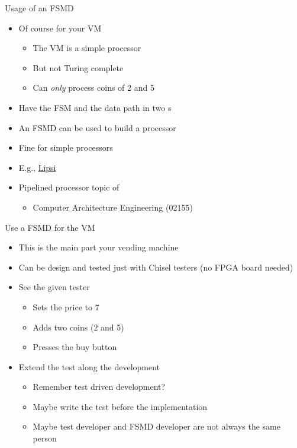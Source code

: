 \begin{frame}[fragile]{Usage of an FSMD}
\begin{itemize}
\item Of course for your VM
\begin{itemize}
\item The VM is a simple processor
\item But not Turing complete
\item Can \emph{only} process coins of 2 and 5
\end{itemize}
\item Have the FSM and the data path in two s
\item An FSMD can be used to build a processor
\item Fine for simple processors
\item E.g., \href{https://github.com/schoeberl/lipsi}{Lipsi}
\item Pipelined processor topic of
\begin{itemize}
\item Computer Architecture Engineering (02155)
\end{itemize}\end{itemize}
\end{frame}

\begin{frame}[fragile]{Use a FSMD for the VM}
\begin{itemize}
\item This is the main part your vending machine
\item Can be design and tested just with Chisel testers (no FPGA board needed)
\item See the given tester
\begin{itemize}
\item Sets the price to 7
\item Adds two coins (2 and 5)
\item Presses the buy button
\end{itemize}
\item Extend the test along the development
\begin{itemize}

\item Remember test driven development?
\item Maybe write the test before the implementation
\item Maybe test developer and FSMD developer are not always the same person
\end{itemize}
\end{itemize}
\end{frame}

